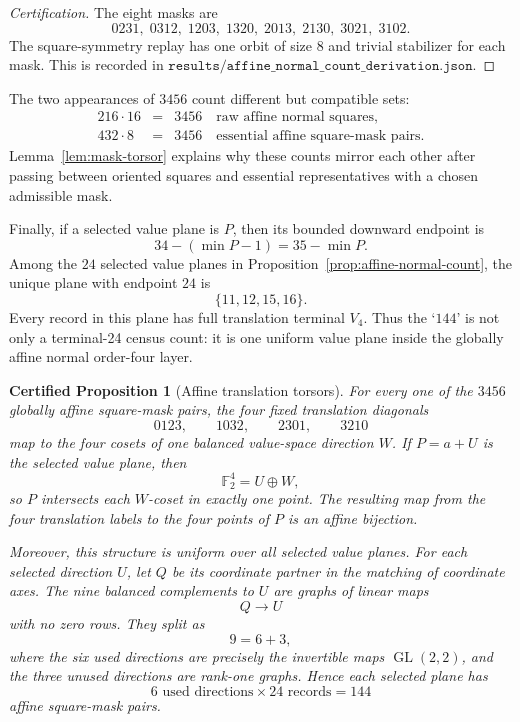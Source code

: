 \documentclass[11pt,a4paper]{article}
\newtheorem{certprop}[theorem]{Certified Proposition}
\theoremstyle{definition}
\theoremstyle{remark}
\newcommand{\F}{\mathbb F}
\newcommand{\GL}{\operatorname{GL}}
\begin{document}
\begin{proof}[Certification]
The eight masks are
\[
0231,\;0312,\;1203,\;1320,\;2013,\;2130,\;3021,\;3102.
\]
The square-symmetry replay has one orbit of size \(8\) and trivial stabilizer
for each mask.  This is recorded in
\(\texttt{results/affine\_normal\_count\_derivation.json}\).
\end{proof}

The two appearances of \(3456\) count different but compatible sets:
\[
\begin{array}{rcl}
216\cdot16&=&3456\quad\text{raw affine normal squares},\\
432\cdot8&=&3456\quad\text{essential affine square-mask pairs}.
\end{array}
\]
Lemma~\ref{lem:mask-torsor} explains why these counts mirror each other after
passing between oriented squares and essential representatives with a chosen
admissible mask.

Finally, if a selected value plane is \(P\), then its bounded downward endpoint
is
\[
34-(\min P-1)=35-\min P.
\]
Among the \(24\) selected value planes in Proposition~\ref{prop:affine-normal-count},
the unique plane with endpoint \(24\) is
\[
\{11,12,15,16\}.
\]
Every record in this plane has full translation terminal \(V_4\).  Thus the
`\(144\)' is not only a terminal-24 census count: it is one uniform value
plane inside the globally affine normal order-four layer.

\begin{certprop}[Affine translation torsors]
\label{prop:affine-translation-torsors}
For every one of the \(3456\) globally affine square-mask pairs, the four
fixed translation diagonals
\[
0123,\qquad 1032,\qquad 2301,\qquad 3210
\]
map to the four cosets of one balanced value-space direction \(W\).  If
\(P=a+U\) is the selected value plane, then
\[
\F_2^4=U\oplus W,
\]
so \(P\) intersects each \(W\)-coset in exactly one point.  The resulting map
from the four translation labels to the four points of \(P\) is an affine
bijection.

Moreover, this structure is uniform over all selected value planes.  For
each selected direction \(U\), let \(Q\) be its coordinate partner in the
matching of coordinate axes.  The nine balanced complements to \(U\) are
graphs of linear maps
\[
Q\longrightarrow U
\]
with no zero rows.  They split as
\[
9=6+3,
\]
where the six used directions are precisely the invertible maps
\(\GL(2,2)\), and the three unused directions are rank-one graphs.  Hence
each selected plane has
\[
6\text{ used directions}\times24\text{ records}=144
\]
affine square-mask pairs.
\end{certprop}
\end{document}
